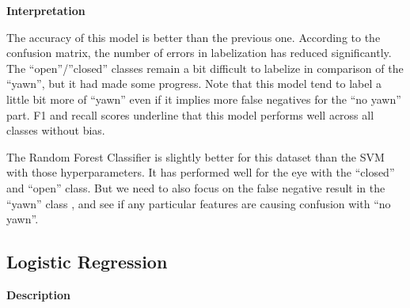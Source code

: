 \documentclass{modeleRapport}
\begin{document}
\textbf{Interpretation\\}

The accuracy of this model is better than the previous one.
According to the confusion matrix, the number of errors in labelization has reduced significantly.
The “open”/”closed” classes remain a bit difficult to labelize in comparison of the “yawn”, but it had made some progress. Note that this model tend to label a little bit more of “yawn” even if it implies more false negatives for the “no yawn” part.
F1 and recall scores underline that this model performs well across all classes without bias.

The Random Forest Classifier is slightly better for this dataset than the SVM with those hyperparameters. It has performed well for the eye with the “closed” and “open” class. But we need to also focus on the false negative result in the “yawn” class , and see if any particular features are causing confusion with “no yawn”.




\newpage

\subsection{Logistic Regression}

\bigskip

\textbf{Description\\}
\end{document}
